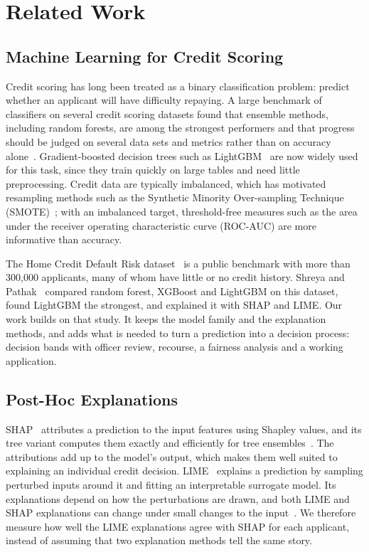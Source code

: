 \section{Related Work}
\label{sec:related}

\subsection{Machine Learning for Credit Scoring}
Credit scoring has long been treated as a binary classification problem: predict whether an applicant will have
difficulty repaying. A large benchmark of classifiers on several credit scoring datasets found that ensemble methods,
including random forests, are among the strongest performers and that progress should be judged on several data
sets and metrics rather than on accuracy alone~\cite{lessmann2015benchmark}. Gradient-boosted decision trees such as
LightGBM~\cite{ke2017lightgbm} are now widely used for this task, since they train quickly on large tables and need
little preprocessing. Credit data are typically imbalanced, which has motivated resampling methods such as the
Synthetic Minority Over-sampling Technique (SMOTE)~\cite{chawla2002smote}; with an imbalanced target, threshold-free measures such as the area under the receiver
operating characteristic curve (ROC-AUC) are more informative than accuracy.

The Home Credit Default Risk dataset~\cite{homecredit2018} is a public benchmark with more than 300{,}000
applicants, many of whom have little or no credit history. Shreya and Pathak~\cite{shreya2025base} compared random
forest, XGBoost and LightGBM on this dataset, found LightGBM the strongest, and explained it with SHAP and LIME. Our
work builds on that study. It keeps the model family and the explanation methods, and adds what is needed to turn a
prediction into a decision process: decision bands with officer review, recourse, a fairness analysis and a working
application.

\subsection{Post-Hoc Explanations}
SHAP~\cite{lundberg2017shap} attributes a prediction to the input features using Shapley values, and its tree
variant computes them exactly and efficiently for tree ensembles~\cite{lundberg2020tree}. The attributions add up to
the model's output, which makes them well suited to explaining an individual credit decision. LIME~\cite{ribeiro2016lime}
explains a prediction by sampling perturbed inputs around it and fitting an interpretable surrogate model. Its
explanations depend on how the perturbations are drawn, and both LIME and SHAP explanations can change under small
changes to the input~\cite{alvarezmelis2018robustness}. We therefore measure how well the LIME explanations agree
with SHAP for each applicant, instead of assuming that two explanation methods tell the same story.

